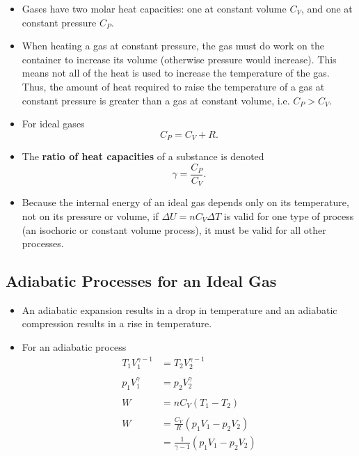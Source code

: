 \documentclass{article}
\begin{document}
\begin{itemize}
  \item Gases have two molar heat capacities: one at constant volume $C_V$, and one at constant pressure $C_P$.

  \item When heating a gas at constant pressure, the gas must do work on the container to increase its volume (otherwise pressure would increase). This means not all of the heat is used to increase the temperature of the gas. Thus, the amount of heat required to raise the temperature of a gas at constant pressure is greater than a gas at constant volume, i.e. $C_P > C_V$.

  \item For ideal gases \[C_P = C_V + R.\]

  \item The \textbf{ratio of heat capacities} of a substance is denoted \[\gamma = \frac{C_P}{C_V}.\]

  \item Because the internal energy of an ideal gas depends only on its temperature, not on its pressure or volume, if $\Delta U = n C_V \Delta T$ is valid for one type of process (an isochoric or constant volume process), it must be valid for all other processes.
\end{itemize}

\subsection{Adiabatic Processes for an Ideal Gas}

\begin{itemize}
  \item An adiabatic expansion results in a drop in temperature and an adiabatic compression results in a rise in temperature.

  \item For an adiabatic process \begin{align*}
          T_1 V_1^{\gamma - 1} & = T_2 V_2^{\gamma - 1}                     \\ \\
          p_1 V_1^\gamma       & = p_2 V_2^\gamma                           \\ \\
          W                    & = n C_V (T_1 - T_2)                        \\ \\
          W                    & = \frac{C_V}{R} (p_1 V_1 - p_2 V_2)        \\
                               & = \frac{1}{\gamma - 1} (p_1 V_1 - p_2 V_2)
        \end{align*}
\end{itemize}
\end{document}
